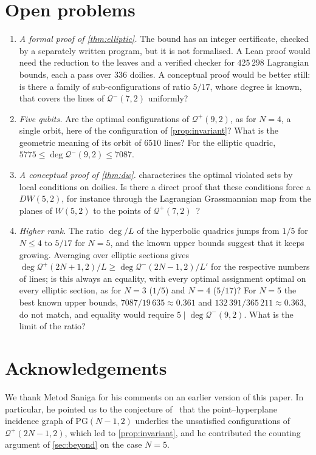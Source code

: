 \documentclass[11pt]{article}
\theoremstyle{definition}
\theoremstyle{remark}
\newcommand{\Qp}{\mathcal{Q}^{+}}
\newcommand{\Qm}{\mathcal{Q}^{-}}
\newcommand{\dg}{\operatorname{deg}}
\begin{document}
\section{Open problems}\label{sec:open}
\begin{enumerate}[leftmargin=*]
\item \emph{A formal proof of \cref{thm:elliptic}.} The bound has an integer certificate, checked by a separately written program, but it is not formalised. A Lean proof would need the reduction to the leaves and a verified checker for $425\,298$ Lagrangian bounds, each a pass over $336$ doilies. A conceptual proof would be better still: is there a family of sub-configurations of ratio $5/17$, whose degree is known, that covers the lines of $\Qm(7,2)$ uniformly?
\item \emph{Five qubits.} Are the optimal configurations of $\Qp(9,2)$, as for $N=4$, a single orbit, here of the configuration of \cref{prop:invariant}? What is the geometric meaning of its orbit of $6510$ lines? For the elliptic quadric, $5775\le\dg\Qm(9,2)\le7087$.
\item \emph{A conceptual proof of \cref{thm:dw}.}  characterises the optimal violated sets by local conditions on doilies. Is there a direct proof that these conditions force a $DW(5,2)$, for instance through the Lagrangian Grassmannian map from the planes of $W(5,2)$ to the points of $\Qp(7,2)$~\cite{Holweck14,Muller24}?
\item \emph{Higher rank.} The ratio $\dg/L$ of the hyperbolic quadrics jumps from $1/5$ for $N\le4$ to $5/17$ for $N=5$, and the known upper bounds suggest that it keeps growing. Averaging over elliptic sections gives $\dg\Qp(2N+1,2)/L\ge\dg\Qm(2N-1,2)/L'$ for the respective numbers of lines; is this always an equality, with every optimal assignment optimal on every elliptic section, as for $N=3$ ($1/5$) and $N=4$ ($5/17$)? For $N=5$ the best known upper bounds, $7087/19\,635\approx0.361$ and $132\,391/365\,211\approx0.363$, do not match, and equality would require $5\mid\dg\Qm(9,2)$. What is the limit of the ratio?
\end{enumerate}

\section*{Acknowledgements}
We thank Metod Saniga for his comments on an earlier version of this paper. In particular, he pointed us to the conjecture of~\cite{Muller24} that the point--hyperplane incidence graph of $\mathrm{PG}(N-1,2)$ underlies the unsatisfied configurations of $\Qp(2N-1,2)$, which led to \cref{prop:invariant}, and he contributed the counting argument of \cref{sec:beyond} on the case $N=5$.
\end{document}
